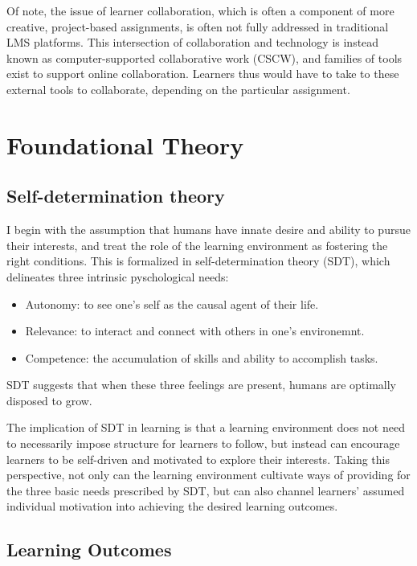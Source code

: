 \documentclass[12pt,twoside,vi]{mitthesis}
\begin{document}
Of note, the issue of learner collaboration, which is often a component of more creative, project-based assignments, is often not fully addressed in traditional LMS platforms. This intersection of collaboration and technology is instead known as computer-supported collaborative work (CSCW), and families of tools exist to support online collaboration. Learners thus would have to take to these external tools to collaborate, depending on the particular assignment.

\section{Foundational Theory}

\subsection{Self-determination theory}

I begin with the assumption that humans have innate desire and ability to pursue their interests, and treat the role of the learning environment as fostering the right conditions. This is formalized in self-determination theory (SDT), which delineates three intrinsic pyschological needs:
\begin{itemize}
\item Autonomy: to see one's self as the causal agent of their life.
\item Relevance: to interact and connect with others in one's environemnt.
\item Competence: the accumulation of skills and ability to accomplish tasks.
\end{itemize}
SDT suggests that when these three feelings are present, humans are optimally disposed to grow.~\cite{ryan2000self}\cite{selfdetermination2}

The implication of SDT in learning is that a learning environment does not need to necessarily impose structure for learners to follow, but instead can encourage learners to be self-driven and motivated to explore their interests. Taking this perspective, not only can the learning environment cultivate ways of providing for the three basic needs prescribed by SDT, but can also channel learners' assumed individual motivation into achieving the desired learning outcomes.~\cite{selfdetermination}\cite{niemiec2009autonomy}

\subsection{Learning Outcomes}
\end{document}
